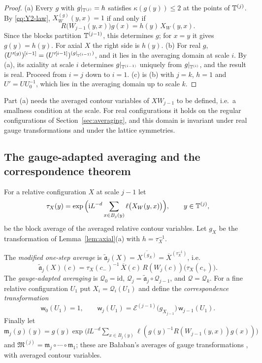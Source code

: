 \begin{proof}
(a) Every $g$ with $g|_{\mathbb T^{(j)}}=h$ satisfies $\kappa(g(y))\le2$ at the points of $\mathbb T^{(j)}$. By \eqref{eq:Y2-law}, $X^{(g)}_W(y,x)=1$ if and only if
\[
R\big(W_{j-1}(y,x)\big)g(x)=h(y)\,X_W(y,x).
\]
Since the blocks partition $\mathbb T^{(j-1)}$, this determines $g$; for $x=y$ it gives $g(y)=h(y)$. For axial $X$ the right side is $h(y)$. (b) For real $g$, $(U'^{(g)})^{[i-1]}=(U'^{[i-1]})^{(g|_{\mathbb T^{(i-1)}})}$, and it lies in the averaging domain at scale $i$. By (a), its axiality at scale $i$ determines $g|_{\mathbb T^{(i-1)}}$ uniquely from $g|_{\mathbb T^{(i)}}$, and the result is real. Proceed from $i=j$ down to $i=1$. (c) is (b) with $j=k$, $h=1$ and $U'=UU_0^{-1}$, which lies in the averaging domain up to scale $k$.
\end{proof}

Part (a) needs the averaged contour variables of $XW_{j-1}$ to be defined, i.e.\ a smallness condition at the scale. For real configurations it holds on the regular configurations of Section~\ref{sec:averaging}, and this domain is invariant under real gauge transformations and under the lattice symmetries.

\subsection{The gauge-adapted averaging and the correspondence theorem}\label{ss:22.3}

For a relative configuration $X$ at scale $j-1$ let
\[
\tau_X(y)=\exp\Big(\mathrm i L^{-d}\sum_{x\in B_j(y)}\ell\big(X_W(y,x)\big)\Big),\qquad y\in\mathbb T^{(j)},
\]
be the block average of the averaged relative contour variables. Let $g_X$ be the transformation of Lemma~\ref{lem:axial}(a) with $h=\tau_X^{-1}$.

\begin{definition}\label{def:adapted}
The \emph{modified one-step average} is $\tilde{\mathfrak a}_j(X)=\overline{X^{(g_X)}}=\overline X^{(\tau_X^{-1})}$, i.e.
\[
\tilde{\mathfrak a}_j(X)(c)=\tau_X(c_-)^{-1}\,\overline X(c)\,R(W_j(c))\big(\tau_X(c_+)\big).
\]
The \emph{gauge-adapted averaging} is $\mathcal Q_0=\mathrm{id}$, $\mathcal Q_j=\tilde{\mathfrak a}_j\circ\mathcal Q_{j-1}$, and $\mathcal Q=\mathcal Q_k$. For a fine relative configuration $U_1$ put $X_i=\mathcal Q_i(U_1)$ and define the \emph{correspondence transformation}
\[
\mathsf w_0(U_1)=1,\qquad\mathsf w_j(U_1)=\mathcal E^{(j-1)}\big(g_{X_{j-1}}\big)\,\mathsf w_{j-1}(U_1).
\]
Finally let $\mathfrak m_j(g)(y)=g(y)\exp\big(\ii L^{-d}\sum_{x\in B_j(y)}\ell(g(y)^{-1}R(W_{j-1}(y,x))g(x))\big)$ and $\mathfrak M^{(j)}=\mathfrak m_j\circ\cdots\circ\mathfrak m_1$; these are Ba\l aban's averages of gauge transformations \cite[(78)--(80)]{BalAvg}, with averaged contour variables.
\end{definition}

